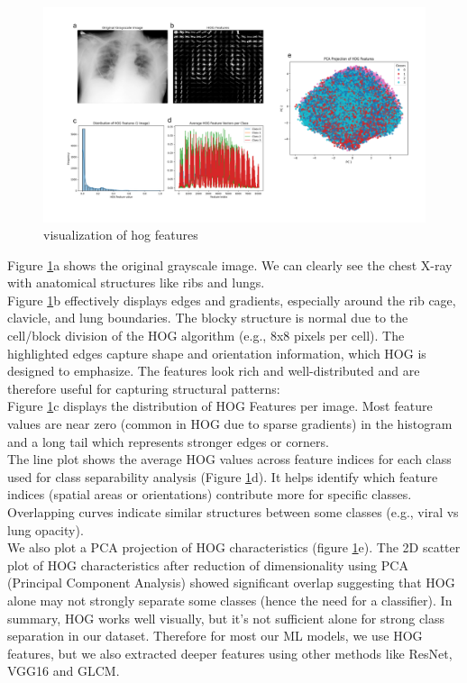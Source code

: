\documentclass{article}
\begin{document}
\begin{figure}%
    \centering
    \includegraphics[width=1.0\linewidth]{hogfeatures_all.png}
    \caption{visualization of hog features}
    \label{fig:visualization of hog features}
\end{figure}
Figure \ref{fig:visualization of hog features}a shows the original grayscale image. We can clearly see the chest X-ray with anatomical structures like ribs and lungs.\\
Figure \ref{fig:visualization of hog features}b effectively displays edges and gradients, especially around the rib cage, clavicle, and lung boundaries. 
The blocky structure is normal due to the cell/block division of the HOG algorithm (e.g., 8x8 pixels per cell). The highlighted edges capture shape and 
orientation information, which HOG is designed to emphasize. The features look rich and well-distributed and are therefore useful for capturing structural patterns:\\
Figure \ref{fig:visualization of hog features}c displays the distribution of HOG Features per image. Most feature values are near zero (common in HOG due 
to sparse gradients) in the histogram and a long tail which represents stronger edges or corners.\\
The line plot shows the average HOG values across feature indices for each class used for class separability analysis 
(Figure \ref{fig:visualization of hog features}d). It helps identify which feature indices (spatial areas or orientations) contribute more for specific classes. 
Overlapping curves indicate similar structures between some classes (e.g., viral vs lung opacity).\\
We also plot a PCA projection of HOG characteristics (figure \ref{fig:visualization of hog features}e). The 2D scatter plot of HOG characteristics 
after reduction of dimensionality using PCA (Principal Component Analysis) showed significant overlap suggesting that HOG alone may not strongly separate 
some classes (hence the need for a classifier).
In summary, HOG works well visually, but it’s not sufficient alone for strong class separation in our dataset. Therefore for most our ML models, 
we use HOG features, but we also extracted deeper features using other methods like ResNet, VGG16 and GLCM.
\\
\end{document}
